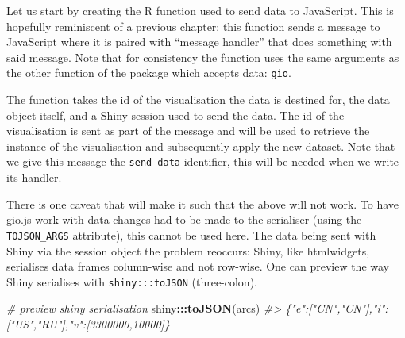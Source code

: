 \documentclass[10pt,]{krantz}
\makeatletter
\newenvironment{Shaded}{\begin{snugshade}}{\end{snugshade}}
\newcommand{\CommentTok}[1]{\textcolor[rgb]{0.37,0.37,0.37}{\textit{#1}}}
\newcommand{\ControlFlowTok}[1]{\textcolor[rgb]{0.27,0.27,0.27}{\textbf{#1}}}
\newcommand{\DataTypeTok}[1]{\textcolor[rgb]{0.27,0.27,0.27}{#1}}
\newcommand{\KeywordTok}[1]{\textcolor[rgb]{0.27,0.27,0.27}{\textbf{#1}}}
\newcommand{\NormalTok}[1]{#1}
\newcommand{\OperatorTok}[1]{\textcolor[rgb]{0.43,0.43,0.43}{\textbf{#1}}}
\newcommand{\StringTok}[1]{\textcolor[rgb]{0.5,0.5,0.5}{#1}}
\newenvironment{kframe}{%
\medskip{}
\setlength{\fboxsep}{.8em}
 \def\at@end@of@kframe{}%
 \ifinner\ifhmode%
  \def\at@end@of@kframe{\end{minipage}}%
  \begin{minipage}{\columnwidth}%
 \fi\fi%
 \def\FrameCommand##1{\hskip\@totalleftmargin \hskip-\fboxsep
 \colorbox{shadecolor}{##1}\hskip-\fboxsep
     \hskip-\linewidth \hskip-\@totalleftmargin \hskip\columnwidth}%
 \MakeFramed {\advance\hsize-\width
   \@totalleftmargin\z@ \linewidth\hsize
   \@setminipage}}%
 {\par\unskip\endMakeFramed%
 \at@end@of@kframe}
\renewenvironment{Shaded}{\begin{kframe}}{\end{kframe}}
\makeatother
\begin{document}
Let us start by creating the R function used to send data to JavaScript. This is hopefully reminiscent of a previous chapter; this function sends a message to JavaScript where it is paired with ``message handler'' that does something with said message. Note that for consistency the function uses the same arguments as the other function of the package which accepts data: \texttt{gio}.

\begin{Shaded}
\end{Shaded}

The function takes the id of the visualisation the data is destined for, the data object itself, and a Shiny session used to send the data. The id of the visualisation is sent as part of the message and will be used to retrieve the instance of the visualisation and subsequently apply the new dataset. Note that we give this message the \texttt{send-data} identifier, this will be needed when we write its handler.

There is one caveat that will make it such that the above will not work. To have gio.js work with data changes had to be made to the serialiser (using the \texttt{TOJSON\_ARGS} attribute), this cannot be used here. The data being sent with Shiny via the session object the problem reoccurs: Shiny, like htmlwidgets, serialises data frames column-wise and not row-wise. One can preview the way Shiny serialises with \texttt{shiny:::toJSON} (three-colon).

\begin{Shaded}
\begin{Highlighting}[]
\CommentTok{# preview shiny serialisation}
\NormalTok{shiny}\OperatorTok{:::}\KeywordTok{toJSON}\NormalTok{(arcs)}
\CommentTok{#> \{"e":["CN","CN"],"i":["US","RU"],"v":[3300000,10000]\}}
\end{Highlighting}
\end{Shaded}
\end{document}
